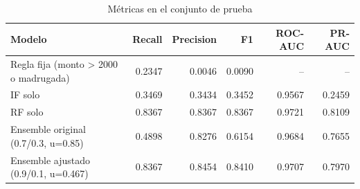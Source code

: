 \begin{table}[H]
\centering
\small
\begin{tabular}{lrrrrr}
\hline
Modelo & Recall & Precision & F1 & ROC-AUC & PR-AUC \\
\hline
Regla fija (monto > 2000 o madrugada) & 0.2347 & 0.0046 & 0.0090 & -- & -- \\
IF solo & 0.3469 & 0.3434 & 0.3452 & 0.9567 & 0.2459 \\
RF solo & 0.8367 & 0.8367 & 0.8367 & 0.9721 & 0.8109 \\
Ensemble original (0.7/0.3, u=0.85) & 0.4898 & 0.8276 & 0.6154 & 0.9684 & 0.7655 \\
Ensemble ajustado (0.9/0.1, u=0.467) & 0.8367 & 0.8454 & 0.8410 & 0.9707 & 0.7970 \\
\hline
\end{tabular}
\caption{Métricas en el conjunto de prueba}
\label{tab:metricas}
\end{table}
